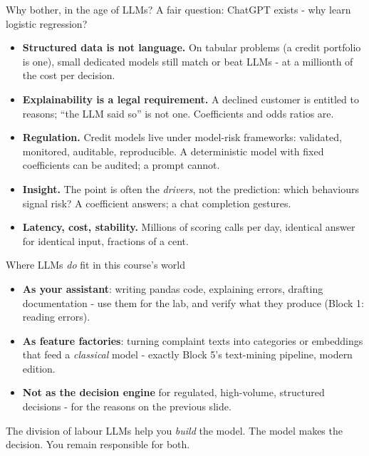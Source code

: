 \documentclass[10pt,aspectratio=169]{beamer}
\begin{document}
\begin{frame}{Why bother, in the age of LLMs?}
  A fair question: ChatGPT exists - why learn logistic regression?
  \vspace{0.3em}
  \begin{itemize}\small
    \item \textbf{Structured data is not language.} On tabular problems
          (a credit portfolio is one), small dedicated models still
          \alert{match or beat} LLMs - at a millionth of the cost per
          decision.
    \item \textbf{Explainability is a legal requirement.} A declined customer
          is entitled to reasons; ``the LLM said so'' is not one.
          Coefficients and odds ratios are.
    \item \textbf{Regulation.} Credit models live under model-risk
          frameworks: validated, monitored, auditable, reproducible.
          A deterministic model with fixed coefficients can be audited;
          a prompt cannot.
    \item \textbf{Insight.} The point is often the \emph{drivers}, not the
          prediction: which behaviours signal risk? A coefficient answers;
          a chat completion gestures.
    \item \textbf{Latency, cost, stability.} Millions of scoring calls per
          day, identical answer for identical input, fractions of a cent.
  \end{itemize}
\end{frame}

\begin{frame}{Where LLMs \emph{do} fit in this course's world}
  \begin{itemize}
    \item \textbf{As your assistant}: writing pandas code, explaining
          errors, drafting documentation - use them for the lab, and
          \alert{verify what they produce} (Block 1: reading errors).
    \item \textbf{As feature factories}: turning complaint texts into
          categories or embeddings that feed a \emph{classical} model -
          exactly Block 5's text-mining pipeline, modern edition.
    \item \textbf{Not as the decision engine} for regulated, high-volume,
          structured decisions - for the reasons on the previous slide.
  \end{itemize}
  \vspace{0.6em}
  \begin{block}{The division of labour}
    LLMs help you \emph{build} the model. The model makes the decision.
    You remain responsible for both.
  \end{block}
\end{frame}
\end{document}
